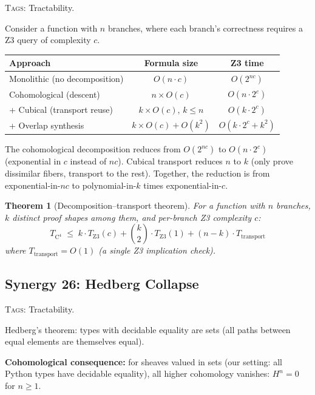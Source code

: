 \documentclass[11pt,a4paper]{article}
\theoremstyle{definition}
\theoremstyle{plain}
\newtheorem{theorem}[definition]{Theorem}
\begin{document}
\textsc{Tags:} Tractability.

\medskip\noindent
Consider a function with $n$ branches, where each branch's
correctness requires a Z3 query of complexity $c$.

\begin{center}
\begin{tabular}{lcc}
\toprule
\textbf{Approach} & \textbf{Formula size} & \textbf{Z3 time} \\
\midrule
Monolithic (no decomposition) & $O(n \cdot c)$ & $O(2^{nc})$ \\
Cohomological (descent) & $n \times O(c)$ & $O(n \cdot 2^c)$ \\
+ Cubical (transport reuse) & $k \times O(c)$, $k \leq n$ &
  $O(k \cdot 2^c)$ \\
+ Overlap synthesis & $k \times O(c) + O(k^2)$ &
  $O(k \cdot 2^c + k^2)$ \\
\bottomrule
\end{tabular}
\end{center}

The cohomological decomposition reduces from $O(2^{nc})$ to
$O(n \cdot 2^c)$ (exponential in $c$ instead of $nc$).
Cubical transport reduces $n$ to $k$ (only prove dissimilar fibers,
transport to the rest).  Together, the reduction is from
exponential-in-$nc$ to polynomial-in-$k$ times exponential-in-$c$.

\begin{theorem}[Decomposition--transport theorem]
\label{thm:decomp-transport}
For a function with $n$ branches, $k$ distinct proof shapes among
them, and per-branch Z3 complexity $c$:
\[
  T_{\mathrm{C}^4}
  \;\leq\;
  k \cdot T_{\mathrm{Z3}}(c) + \binom{k}{2} \cdot T_{\mathrm{Z3}}(1)
  + (n - k) \cdot T_{\mathrm{transport}}
\]
where $T_{\mathrm{transport}} = O(1)$ (a single Z3 implication check).
\end{theorem}


\subsection{Synergy 26: Hedberg Collapse}
\label{sec:syn-hedberg}

\textsc{Tags:} Tractability.

\medskip\noindent
Hedberg's theorem: types with decidable equality are sets (all
paths between equal elements are themselves equal).

\textbf{Cohomological consequence:} for sheaves valued in sets
(our setting: all Python types have decidable equality), all
higher cohomology vanishes: $H^n = 0$ for $n \geq 1$.
\end{document}
